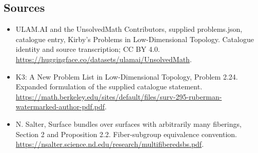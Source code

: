 \documentclass[11pt,a4paper]{article}
\begin{document}
\subsection{Sources}
\begin{itemize}
\item[S1] ULAM.AI and the UnsolvedMath Contributors, supplied problems.json, catalogue entry, Kirby's Problems in Low-Dimensional Topology. Catalogue identity and source transcription; CC BY 4.0.
\url{https://huggingface.co/datasets/ulamai/UnsolvedMath}.
\item[S2] K3: A New Problem List in Low-Dimensional Topology, Problem 2.24. Expanded formulation of the supplied catalogue statement.
\url{https://math.berkeley.edu/sites/default/files/surv-295-ruberman-watermarked-author-pdf.pdf}.
\item[S3] N. Salter, Surface bundles over surfaces with arbitrarily many fiberings, Section 2 and Proposition 2.2. Fiber-subgroup equivalence convention.
\url{https://nsalter.science.nd.edu/research/multifiberedsbs.pdf}.
\end{itemize}
\end{document}
